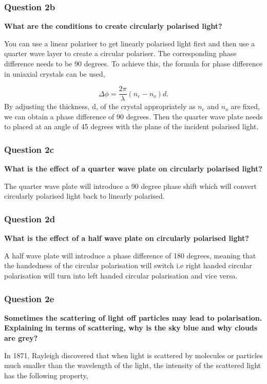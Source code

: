\documentclass{article}
\begin{document}
\subsubsection{Question 2b}
\textbf{What are the conditions to create circularly polarised light?}

You can use a linear polariser to get linearly polarised light first
and then use a quarter wave layer to create a circular polariser. The 
corresponding phase difference needs to be 90 degrees. To achieve this,
the formula for phase difference in uniaxial crystals can be used,

\begin{equation}
    \Delta \phi = \frac{2\pi}{\lambda}(n_e-n_o)d.
\end{equation}
By adjusting the thickness, d, of the crystal appropriately as $n_e$ 
and $n_o$ are fixed, we can obtain a phase difference of 90 degrees. 
Then the quarter wave plate needs to placed at an angle of 45 degrees
with the plane of the incident polarised light.

\subsubsection{Question 2c}
\textbf{What is the effect of a quarter wave plate on circularly polarised light?}

The quarter wave plate will introduce a 90 degree phase shift which 
will convert circularly polarised light back to linearly polarised.

\subsubsection{Question 2d}
\textbf{What is the effect of a half wave plate on circularly polarised light?}

A half wave plate will introduce a phase difference of 180 degrees, 
meaning that the handedness of the circular polarisation will switch i.e 
right handed circular polarisation will turn into left handed circular
polarisation and vice versa.

\subsubsection{Question 2e}
\textbf{Sometimes the scattering of light off particles may lead to polarisation.
Explaining in terms of scattering, why is the sky blue and why clouds are grey?}

In 1871, Rayleigh discovered that when light is scattered by molecules or 
particles much smaller than the wavelength of the light, the intensity 
of the scattered light has the following property,
\end{document}
